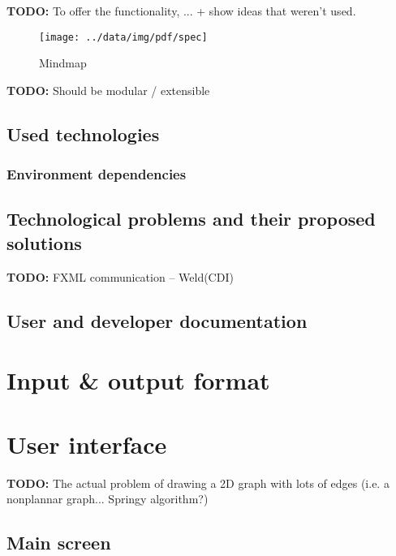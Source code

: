 \documentclass[10pt,a4paper,oneside]{article}
\newcommand{\TODO}[1]{{\textbf{TODO:} #1}} %
\begin{document}
\TODO To offer the functionality, ... + show ideas that weren't used.

\FloatBarrier
\begin{figure}
        \centering
        \texttt{[image: ../data/img/pdf/spec]}
        \caption{Mindmap}
        \label{fig:mindmap}
\end{figure}
\FloatBarrier

\TODO Should be modular / extensible



\subsection{Used technologies}
\subsubsection{Environment dependencies}
\subsection{Technological problems and their proposed solutions}
\TODO FXML communication -- Weld(CDI)


\subsection{User and developer documentation}









\section{Input \& output format}













\section{User interface}

\TODO The actual problem of drawing a 2D graph with lots of edges (i.e. a nonplannar graph... Springy algorithm?)

\subsection{Main screen}
\end{document}
